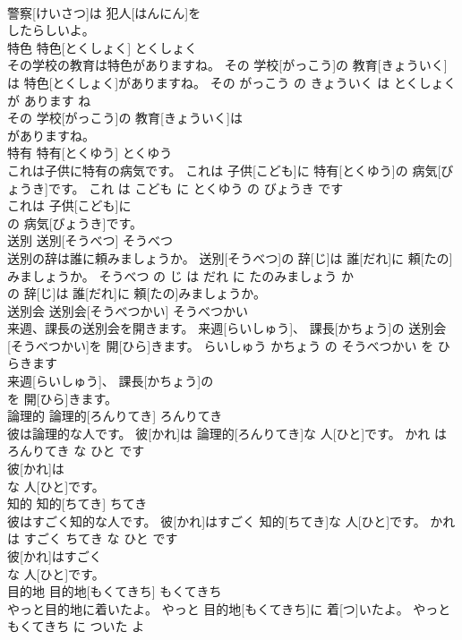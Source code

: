 \documentclass[8pt]{extreport}
\begin{document}
\begin{CJK}{UTF8}{min}
\\	警察[けいさつ]は 犯人[はんにん]を
\\	したらしいよ。			
\\	特色	特色[とくしょく]	とくしょく	
\\	その学校の教育は特色がありますね。	その 学校[がっこう]の 教育[きょういく]は 特色[とくしょく]がありますね。	その がっこう の きょういく は とくしょく が あります ね	
\\	その 学校[がっこう]の 教育[きょういく]は
\\	がありますね。			
\\	特有	特有[とくゆう]	とくゆう	
\\	これは子供に特有の病気です。	これは 子供[こども]に 特有[とくゆう]の 病気[びょうき]です。	これ は こども に とくゆう の びょうき です	
\\	これは 子供[こども]に
\\	の 病気[びょうき]です。			
\\	送別	送別[そうべつ]	そうべつ	
\\	送別の辞は誰に頼みましょうか。	送別[そうべつ]の 辞[じ]は 誰[だれ]に 頼[たの]みましょうか。	そうべつ の じ は だれ に たのみましょう か	
\\	の 辞[じ]は 誰[だれ]に 頼[たの]みましょうか。			
\\	送別会	送別会[そうべつかい]	そうべつかい	
\\	来週、課長の送別会を開きます。	来週[らいしゅう]、 課長[かちょう]の 送別会[そうべつかい]を 開[ひら]きます。	らいしゅう かちょう の そうべつかい を ひらきます	
\\	来週[らいしゅう]、 課長[かちょう]の
\\	を 開[ひら]きます。			
\\	論理的	論理的[ろんりてき]	ろんりてき	
\\	彼は論理的な人です。	彼[かれ]は 論理的[ろんりてき]な 人[ひと]です。	かれ は ろんりてき な ひと です	
\\	彼[かれ]は
\\	な 人[ひと]です。			
\\	知的	知的[ちてき]	ちてき	
\\	彼はすごく知的な人です。	彼[かれ]はすごく 知的[ちてき]な 人[ひと]です。	かれ は すごく ちてき な ひと です	
\\	彼[かれ]はすごく
\\	な 人[ひと]です。			
\\	目的地	目的地[もくてきち]	もくてきち	
\\	やっと目的地に着いたよ。	やっと 目的地[もくてきち]に 着[つ]いたよ。	やっと もくてきち に ついた よ	

\end{CJK}
\end{document}
